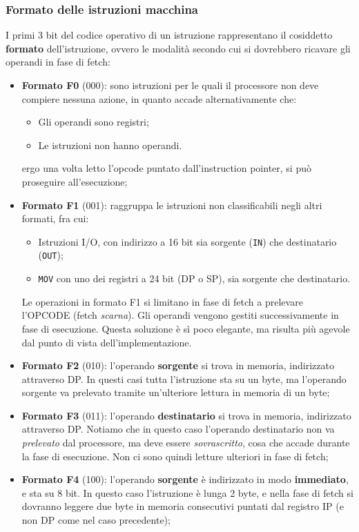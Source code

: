 \documentclass[a4paper,11pt]{article}
\begin{document}
\subsubsection{Formato delle istruzioni macchina}
I primi 3 bit del codice operativo di un istruzione rappresentano il cosiddetto \textbf{formato} dell'istruzione, ovvero le modalità secondo cui si dovrebbero ricavare gli operandi in fase di fetch:
\begin{itemize}
	\item \textbf{Formato F0} (000): sono istruzioni per le quali il processore non deve compiere nessuna azione, in quanto accade alternativamente che:
		\begin{itemize}
			\item Gli operandi sono registri;
			\item Le istruzioni non hanno operandi.
		\end{itemize}
		ergo una volta letto l'opcode puntato dall'instruction pointer, si può proseguire all'esecuzione;
	\item \textbf{Formato F1} (001): raggruppa le istruzioni non classificabili negli altri formati, fra cui:
		\begin{itemize}
			\item Istruzioni I/O, con indirizzo a 16 bit sia sorgente (\lstinline|IN|) che destinatario (\lstinline|OUT|);
			\item \lstinline|MOV| con uno dei registri a 24 bit (DP o SP), sia sorgente che destinatario.
		\end{itemize}
		Le operazioni in formato F1 si limitano in fase di fetch a prelevare l'OPCODE (fetch \textit{scarna}).
		Gli operandi vengono gestiti successivamente in fase di esecuzione.
		Questa soluzione è sì poco elegante, ma risulta più agevole dal punto di vista dell'implementazione.
	\item \textbf{Formato F2} (010): l'operando \textbf{sorgente} si trova in memoria, indirizzato attraverso DP.
		In questi casi tutta l'istruzione sta su un byte, ma l'operando sorgente va prelevato tramite un'ulteriore lettura in memoria di un byte;
	\item \textbf{Formato F3} (011): l'operando \textbf{destinatario} si trova in memoria, indirizzato attraverso DP.
	Notiamo che in questo caso l'operando destinatario non va \textit{prelevato} dal processore, ma deve essere \textit{sovrascritto}, cosa che accade durante la fase di esecuzione.
	Non ci sono quindi letture ulteriori in fase di fetch;
\item \textbf{Formato F4} (100): l'operando \textbf{sorgente} è indirizzato in modo \textbf{immediato}, e sta su 8 bit.
	In questo caso l'istruzione è lunga 2 byte, e nella fase di fetch si dovranno leggere due byte in memoria consecutivi puntati dal registro IP (e non DP come nel caso precedente);


\end{itemize}
\end{document}
